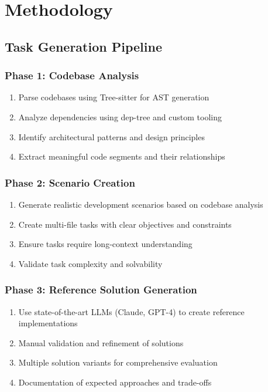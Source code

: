 \documentclass{article}
\begin{document}
\section{Methodology}

\subsection{Task Generation Pipeline}

\subsubsection{Phase 1: Codebase Analysis}
\begin{enumerate}
    \item Parse codebases using Tree-sitter for AST generation
    \item Analyze dependencies using dep-tree and custom tooling
    \item Identify architectural patterns and design principles
    \item Extract meaningful code segments and their relationships
\end{enumerate}

\subsubsection{Phase 2: Scenario Creation}
\begin{enumerate}
    \item Generate realistic development scenarios based on codebase analysis
    \item Create multi-file tasks with clear objectives and constraints
    \item Ensure tasks require long-context understanding
    \item Validate task complexity and solvability
\end{enumerate}

\subsubsection{Phase 3: Reference Solution Generation}
\begin{enumerate}
    \item Use state-of-the-art LLMs (Claude, GPT-4) to create reference implementations
    \item Manual validation and refinement of solutions
    \item Multiple solution variants for comprehensive evaluation
    \item Documentation of expected approaches and trade-offs
\end{enumerate}
\end{document}
